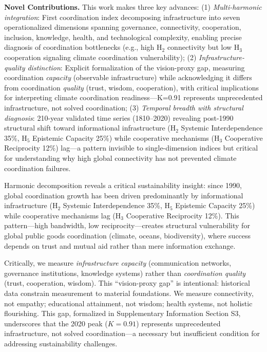 \documentclass[11pt,letterpaper]{article}
\begin{document}
\textbf{Novel Contributions.} This work makes three key advances: (1) \textit{Multi-harmonic integration}: First coordination index decomposing infrastructure into seven operationalized dimensions spanning governance, connectivity, cooperation, inclusion, knowledge, health, and technological complexity, enabling precise diagnosis of coordination bottlenecks (e.g., high H$_2$ connectivity but low H$_3$ cooperation signaling climate coordination vulnerability); (2) \textit{Infrastructure-quality distinction}: Explicit formalization of the vision-proxy gap, measuring coordination \textit{capacity} (observable infrastructure) while acknowledging it differs from coordination \textit{quality} (trust, wisdom, cooperation), with critical implications for interpreting climate coordination readiness---K=0.91 represents unprecedented infrastructure, not solved coordination; (3) \textit{Temporal breadth with structural diagnosis}: 210-year validated time series (1810--2020) revealing post-1990 structural shift toward informational infrastructure (H$_2$ Systemic Interdependence 35\%, H$_5$ Epistemic Capacity 25\%) while cooperative mechanisms (H$_3$ Cooperative Reciprocity 12\%) lag---a pattern invisible to single-dimension indices but critical for understanding why high global connectivity has not prevented climate coordination failures.

Harmonic decomposition reveals a critical sustainability insight: since 1990, global coordination growth has been driven predominantly by informational infrastructure (H$_2$ Systemic Interdependence 35\%, H$_5$ Epistemic Capacity 25\%) while cooperative mechanisms lag (H$_3$ Cooperative Reciprocity 12\%). This pattern---high bandwidth, low reciprocity---creates structural vulnerability for global public goods coordination (climate, oceans, biodiversity), where success depends on trust and mutual aid rather than mere information exchange.

Critically, we measure \textit{infrastructure capacity} (communication networks, governance institutions, knowledge systems) rather than \textit{coordination quality} (trust, cooperation, wisdom). This ``vision-proxy gap'' is intentional: historical data constrain measurement to material foundations. We measure connectivity, not empathy; educational attainment, not wisdom; health systems, not holistic flourishing. This gap, formalized in Supplementary Information Section S3, underscores that the 2020 peak ($K=0.91$) represents unprecedented infrastructure, not solved coordination---a necessary but insufficient condition for addressing sustainability challenges.
\end{document}
